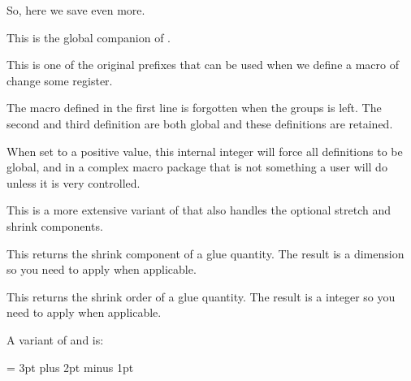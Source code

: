 So, here we save even more.

\stopnewprimitive

\startnewprimitive[title={\prm {glettonothing}}]

This is the global companion of .

\stopnewprimitive

\startoldprimitive[title={\prm {global}}]

This is one of the original prefixes that can be used when we define a macro of
change some register.

\starttyping
\bgroup
       \def\MyMacroA{a}
\global\def\MyMacroB{a}
      \gdef\MyMacroC{a}
\egroup
\stoptyping

The macro defined in the first line is forgotten when the groups is left. The
second and third definition are both global and these definitions are retained.

\stopoldprimitive

\startoldprimitive[title={\prm {globaldefs}}]

When set to a positive value, this internal integer will force all definitions to
be global, and in a complex macro package that is not something a user will do
unless it is very controlled.

\stopoldprimitive

\startoldprimitive[title={\prm {glueexpr}}]

This is a more extensive variant of  that also handles the optional
stretch and shrink components.

\stopoldprimitive

\startoldprimitive[title={\prm {glueshrink}}]

This returns the shrink component of a glue quantity. The result is a dimension
so you need to apply  when applicable.

\stopoldprimitive

\startoldprimitive[title={\prm {glueshrinkorder}}]

This returns the shrink order of a glue quantity. The result is a integer so you
need to apply  when applicable.

\stopoldprimitive

\startnewprimitive[title={\prm {gluespecdef}}]

A variant of  and  is:

\starttyping
\gluespecdef\MyGlue = 3pt plus 2pt minus 1pt
\stoptyping

